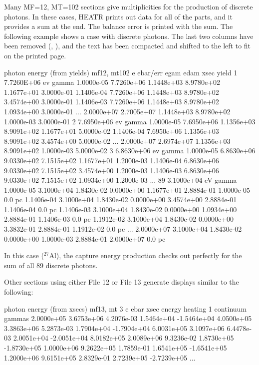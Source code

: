Many MF=12, MT=102 sections give multiplicities for the production
of discrete photons.  In these cases, HEATR prints out data for
all of the parts, and it provides a sum at the end.  The
balance error is printed with the sum.  The following example shows
a case with discrete photons.  The last two columns have been
removed (, ), and the text has been
compacted and shifted to the left to fit on the printed page.

\small
\begin{ccode}

  photon energy (from yields) mf12, mt102
           e    ebar/err        egam        edam        xsec       yield
  1   7.7260E+06 ev gamma
  1.0000e-05  7.7260e+06  1.1448e+03  8.9780e+02  1.1677e+01  3.0000e-01
  1.1406e-04  7.7260e+06  1.1448e+03  8.9780e+02  3.4574e+00  3.0000e-01
  1.1406e-03  7.7260e+06  1.1448e+03  8.9780e+02  1.0934e+00  3.0000e-01
    ...
  2.0000e+07  2.7005e+07  1.1448e+03  8.9780e+02  1.0000e-03  3.0000e-01
  2   7.6950e+06 ev gamma
  1.0000e-05  7.6950e+06  1.1356e+03  8.9091e+02  1.1677e+01  5.0000e-02
  1.1406e-04  7.6950e+06  1.1356e+03  8.9091e+02  3.4574e+00  5.0000e-02
    ...
  2.0000e+07  2.6974e+07  1.1356e+03  8.9091e+02  1.0000e-03  5.0000e-02
  3   6.8630e+06 ev gamma
  1.0000e-05  6.8630e+06  9.0330e+02  7.1515e+02  1.1677e+01  1.2000e-03
  1.1406e-04  6.8630e+06  9.0330e+02  7.1515e+02  3.4574e+00  1.2000e-03
  1.1406e-03  6.8630e+06  9.0330e+02  7.1515e+02  1.0934e+00  1.2000e-03
    ...
 89   3.1000e+04 eV gamma
  1.0000e-05  3.1000e+04  1.8430e-02  0.0000e+00  1.1677e+01  2.8884e-01
  1.0000e-05     0.0 pc
  1.1406e-04  3.1000e+04  1.8430e-02  0.0000e+00  3.4574e+00  2.8884e-01
  1.1406e-04     0.0 pc
  1.1406e-03  3.1000e+04  1.8430e-02  0.0000e+00  1.0934e+00  2.8884e-01
  1.1406e-03     0.0 pc
  1.1912e-02  3.1000e+04  1.8430e-02  0.0000e+00  3.3832e-01  2.8884e-01
  1.1912e-02     0.0 pc
    ...
  2.0000e+07  3.1000e+04  1.8430e-02  0.0000e+00  1.0000e-03  2.8884e-01
  2.0000e+07     0.0 pc

\end{ccode}
\normalsize

\noindent
In this case ($^{27}$Al), the capture energy production checks out
perfectly for the sum of all 89 discrete photons.

Other sections using either File 12 or File 13 generate displays
similar to the following:

\small
\begin{ccode}

 photon energy (from xsecs) mf13, mt  3
              e          ebar          xsec        energy       heating
     1  continuum gammas
     2.0000e+05    3.6753e+06    4.2076e-03    1.5464e+04   -1.5464e+04
     4.0500e+05    3.3863e+06    5.2873e-03    1.7904e+04   -1.7904e+04
     6.0031e+05    3.1097e+06    6.4478e-03    2.0051e+04   -2.0051e+04
     8.0182e+05    2.0089e+06    9.3236e-02    1.8730e+05   -1.8730e+05
     1.0000e+06    9.2622e+05    1.7859e-01    1.6541e+05   -1.6541e+05
     1.2000e+06    9.6151e+05    2.8329e-01    2.7239e+05   -2.7239e+05
   ...

\end{ccode}
\normalsize

